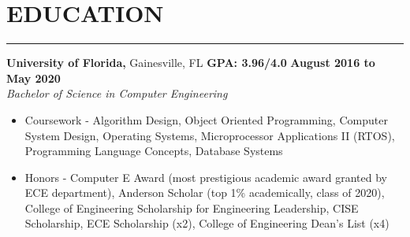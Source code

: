 \section*{EDUCATION}

\hrule \relax
\sectionheaderspace

\noindent \textbf{University of Florida,} Gainesville, FL
\hfill\textbf{GPA: 3.96/4.0}
\hfill\textbf{August 2016 to May 2020}\\
\textit{Bachelor of Science in Computer Engineering}
\begin{itemize}[noitemsep,nolistsep, label = {-}]
	\item  Coursework - 
									Algorithm Design,
									Object Oriented Programming,
									Computer System Design,
									Operating Systems,
									Microprocessor Applications II (RTOS),
									Programming Language Concepts,
									Database Systems
	\item  Honors - 
											{Computer E Award (most prestigious academic award granted by ECE department)},
											{Anderson Scholar (top 1\% academically, class of 2020)},
											{College of Engineering Scholarship for Engineering Leadership},
									CISE Scholarship,
									ECE Scholarship (x2),
									College of Engineering Dean\rq s List (x4)
\end{itemize}
\subsectionspace
